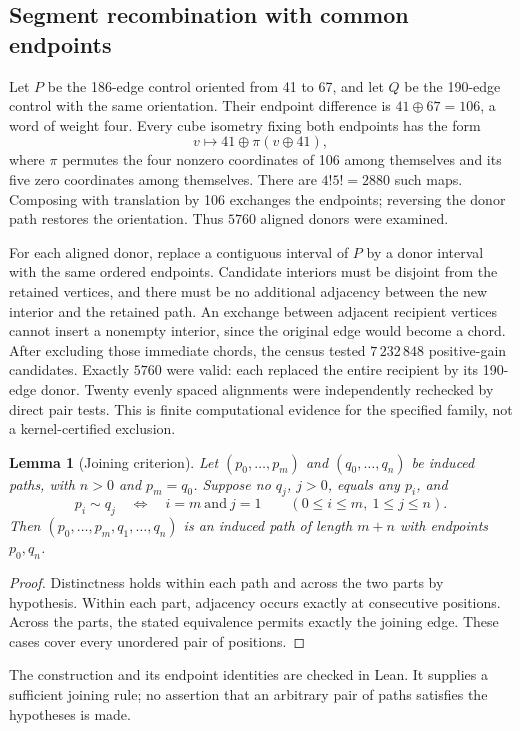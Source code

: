 \documentclass[11pt,a4paper]{article}
\newtheorem{lemma}[theorem]{Lemma}
\theoremstyle{definition}
\theoremstyle{remark}
\begin{document}
\subsection{Segment recombination with common endpoints}
Let $P$ be the 186-edge control oriented from 41 to 67, and let $Q$ be the 190-edge control with the same orientation. Their endpoint difference is $41\oplus67=106$, a word of weight four. Every cube isometry fixing both endpoints has the form
\[
v\longmapsto 41\oplus\pi(v\oplus41),
\]
where $\pi$ permutes the four nonzero coordinates of 106 among themselves and its five zero coordinates among themselves. There are $4!5!=2880$ such maps. Composing with translation by 106 exchanges the endpoints; reversing the donor path restores the orientation. Thus $5760$ aligned donors were examined.

For each aligned donor, replace a contiguous interval of $P$ by a donor interval with the same ordered endpoints. Candidate interiors must be disjoint from the retained vertices, and there must be no additional adjacency between the new interior and the retained path. An exchange between adjacent recipient vertices cannot insert a nonempty interior, since the original edge would become a chord. After excluding those immediate chords, the census tested $7\,232\,848$ positive-gain candidates. Exactly $5760$ were valid: each replaced the entire recipient by its 190-edge donor. Twenty evenly spaced alignments were independently rechecked by direct pair tests. This is finite computational evidence for the specified family, not a kernel-certified exclusion.

\begin{lemma}[Joining criterion]
Let $(p_0,\ldots,p_m)$ and $(q_0,\ldots,q_n)$ be induced paths, with $n>0$ and $p_m=q_0$. Suppose no $q_j$, $j>0$, equals any $p_i$, and
\[
p_i\sim q_j\quad\Longleftrightarrow\quad i=m\ \text{and}\ j=1
\qquad(0\le i\le m,\ 1\le j\le n).
\]
Then $(p_0,\ldots,p_m,q_1,\ldots,q_n)$ is an induced path of length $m+n$ with endpoints $p_0,q_n$.
\end{lemma}
\begin{proof}
Distinctness holds within each path and across the two parts by hypothesis. Within each part, adjacency occurs exactly at consecutive positions. Across the parts, the stated equivalence permits exactly the joining edge. These cases cover every unordered pair of positions.
\end{proof}
The construction and its endpoint identities are checked in Lean. It supplies a sufficient joining rule; no assertion that an arbitrary pair of paths satisfies the hypotheses is made.
\end{document}
